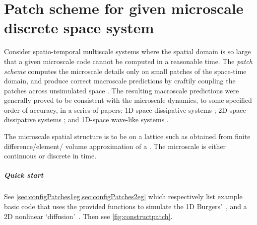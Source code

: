\chapter{Patch scheme for given microscale discrete space system}
\label{sec:patch}
\localtableofcontents



Consider spatio-temporal multiscale systems where the
spatial domain is so large that a given microscale code
cannot be computed in a reasonable time.  The \emph{patch
scheme} computes the microscale details only on small
patches of the space-time domain, and produce correct
macroscale predictions by craftily coupling the patches
across unsimulated space \cite[e.g.]{Hyman2005, Samaey03b,
Samaey04, Roberts06d, Liu2015}.  The resulting macroscale
predictions were generally proved to be consistent with the
microscale dynamics, to some specified order of accuracy, in
a series of papers: 1D-space dissipative systems
\cite[]{Roberts06d, Bunder2013b}; 2D-space dissipative
systems \cite[]{Roberts2011a, Bunder2020a}; and 1D-space
wave-like systems \cite[]{Cao2014a}.

The microscale spatial structure is to be on a lattice such
as obtained from finite difference\slash element\slash
volume approximation of a \pde. The microscale is either
continuous or discrete in time.

\paragraph{Quick start}
See \cref{sec:configPatches1eg,sec:configPatches2eg} which
respectively list example basic code that uses the provided 
functions to simulate the 1D Burgers'~\pde, and a 2D 
nonlinear `diffusion'~\pde.  Then see \cref{fig:constructpatch}.

